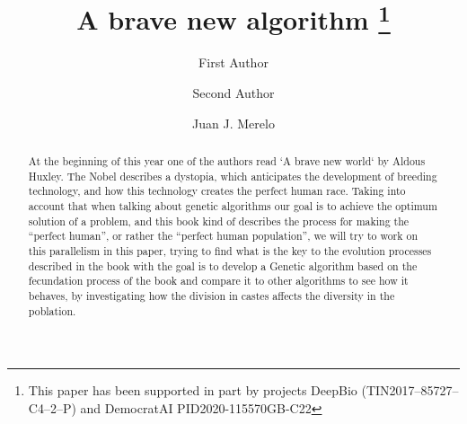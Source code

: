 \documentclass[runningheads]{llncs}
\begin{document}
%
\title{A brave new algorithm \thanks{This paper has been supported in part by projects DeepBio (TIN2017--85727--C4--2--P) and DemocratAI PID2020-115570GB-C22}}
%
%
\author{First Author \and
Second Author \and
Juan J. Merelo}
%
%
%
\maketitle              %
%
\begin{abstract}

At the beginning of this year one of the authors read `A brave new
world` by Aldous Huxley.  The Nobel describes a dystopia, which
anticipates the development of breeding technology, and how this
technology creates the perfect human race. Taking into account that
when talking about genetic algorithms our goal is to achieve the
optimum solution of a problem, and this book kind of describes the
process for making the “perfect human”, or rather the ``perfect human
population'', we will try to work on this parallelism in this paper,
trying to find what is the key to the evolution processes described in
the book with the goal is to develop a Genetic algorithm based on the
fecundation process of the book and compare it to other algorithms to
see how it behaves, by investigating how the division in castes
affects the diversity in the poblation.

\end{abstract}
%
%
%

% 








\end{document}
